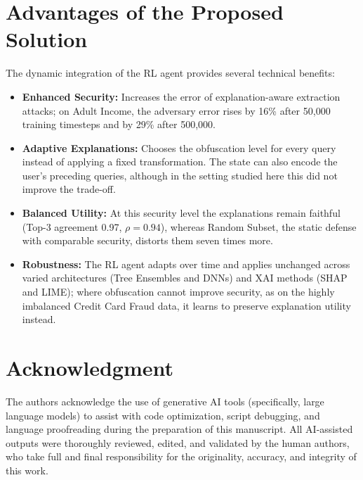 \documentclass[conference]{IEEEtran}
\DeclareRobustCommand{\rev}[1]{{\color{blue}#1}}
\DeclareRobustCommand{\revnew}[1]{{\color{revpurple}#1}}
\begin{document}
\section{Advantages of the Proposed Solution}
The dynamic integration of the RL agent provides several technical benefits:
\begin{itemize}
    \item \textbf{Enhanced Security:} \revnew{Increases the error of explanation-aware extraction attacks; on Adult Income, the adversary error rises by 16\% after 50,000 training timesteps and by 29\% after 500,000.}
    \item \textbf{Adaptive Explanations:} \revnew{Chooses the obfuscation level for every query instead of applying a fixed transformation. The state can also encode the user's preceding queries, although in the setting studied here this did not improve the trade-off.}
    \item \textbf{Balanced Utility:} \revnew{At this security level the explanations remain faithful (Top-3 agreement 0.97, $\rho=0.94$), whereas Random Subset, the static defense with comparable security, distorts them seven times more.}
    \item \textbf{Robustness:} The RL agent adapts over time \rev{and applies unchanged} across varied architectures (Tree Ensembles and DNNs) and XAI methods (SHAP and LIME)\rev{; where obfuscation cannot improve security, as on the highly imbalanced Credit Card Fraud data, it learns to preserve explanation utility instead}.
\end{itemize}

\section*{Acknowledgment}
The authors acknowledge the use of generative AI tools (specifically, large language models) to assist with code optimization, script debugging, and language proofreading during the preparation of this manuscript. All AI-assisted outputs were thoroughly reviewed, edited, and validated by the human authors, who take full and final responsibility for the originality, accuracy, and integrity of this work.






\end{document}
